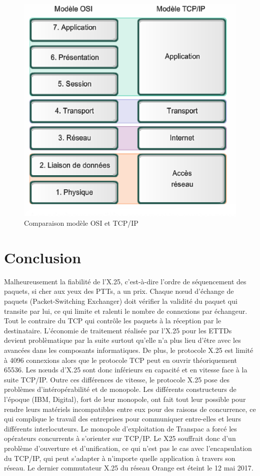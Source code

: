 \documentclass[12pt]{report}
\begin{document}
\begin{figure}[htp]
  \centering
  \includegraphics[scale=0.5]{images/osi-tcp-ip}
  \caption{Comparaison modèle OSI et TCP/IP}
  \label{fig:osi-tcp}
\end{figure}

\section{Conclusion}

Malheureusement la fiabilité de l'X.25, c'est-à-dire l'ordre de séquencement des paquets, si cher aux yeux des PTTs, a un prix.
Chaque nœud d'échange de paquets (Packet-Switching Exchanger) doit vérifier la validité du paquet qui
transite par lui, ce qui limite et ralenti le nombre de connexions par échangeur. Tout le contraire du TCP qui contrôle les paquets à la réception par le destinataire.
L'économie de traitement réalisée par l'X.25 pour les ETTDs devient problèmatique par la suite surtout qu'elle n'a plus lieu d'être avec les avancées dans les composants informatiques.
De plus, le protocole X.25 est limité à 4096 connexions alors que le protocole TCP peut en ouvrir théoriquement 65536. Les nœuds d'X.25 sont donc inférieurs en capacité et en vitesse face à la suite TCP/IP.
Outre ces différences de vitesse, le protocole X.25 pose des problèmes d'intéropérabilité et de monopole. Les différents constructeurs de l'époque (IBM, Digital), fort de leur monopole,
ont fait tout leur possible pour rendre leurs matériels incompatibles entre eux pour des raisons de concurrence, ce qui complique le travail des entreprises pour
communiquer entre-elles et leurs différents interlocuteurs\cite{gatoux}. Le monopole d'exploitation de Transpac a forcé les opérateurs concurrents à s'orienter sur TCP/IP.
Le X25 souffrait donc d'un problème d'ouverture et d'unification, ce qui n'est pas le cas avec l'encapsulation du TCP/IP,
qui peut s'adapter à n'importe quelle application à travers son réseau. Le dernier commutateur X.25 du réseau Orange est éteint le 12 mai 2017\cite{killme}.
\end{document}
